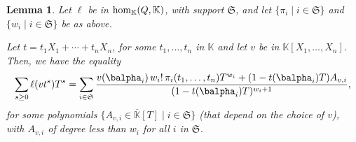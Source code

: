 \documentclass[12pt]{article}
\def\K {\ensuremath{\mathbb{K}}}
\def\Kbar {{\ensuremath{\overline{\mathbb{K}}}}}
\newtheorem{Lemma}{Lemma}
\begin{document}
\begin{Lemma}\label{lemma:formula}
  Let $\ell$ be in ${\rm hom}_\K(Q,\K)$, with support $\mathfrak{S}$,
  and let $\{\pi_i \mid i \in \mathfrak{S}\}$ and $\{w_i \mid i \in
  \mathfrak{S}\}$ be as above.

  Let $t=t_1 X_1 + \cdots +t_n X_n$, for some $t_1,\dots,t_n$ in $\K$
  and let $v$ be in $\K[X_1,\dots,X_n]$. Then, we have the equality
  \begin{align}\label{eq:sumgenseries}
  \sum_{s \ge 0} \ell(v t^s)T^s =
\sum_{i \in \mathfrak{S}} \frac{
  v(\balpha_i)\, w_i!\, \pi_{i}(t_1,\dots,t_n)
  T^{w_i} + (1-t(\balpha_i)    T)A_{v,i}}
  {(1-t(\balpha_i) T)^{w_{i}+1}},    
  \end{align}
 for some polynomials $\{A_{v,i} \in \Kbar[T] \mid i \in \mathfrak{S}\}$ (that
 depend on the choice of $v$), with $A_{v,i}$ of degree less than $w_i$ for all $i$ in
 $\mathfrak{S}$.
\end{Lemma}
\end{document}
